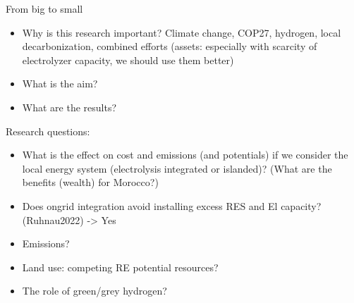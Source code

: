 From big to small
\begin{itemize}
    \item Why is this research important? Climate change, COP27, hydrogen, local decarbonization, combined efforts (assets: especially with scarcity of electrolyzer capacity, we should use them better)
    \item What is the aim?
    \item What are the results?
\end{itemize}

Research questions:
\begin{itemize}
    \item What is the effect on cost and emissions (and potentials) if we consider the local energy system (electrolysis integrated or islanded)? (What are the benefits (wealth) for Morocco?)
    \item Does ongrid integration avoid installing excess RES and El capacity? (Ruhnau2022) -> Yes
    \item Emissions?
    \item Land use: competing RE potential resources?
    \item The role of green/grey hydrogen?
\end{itemize}